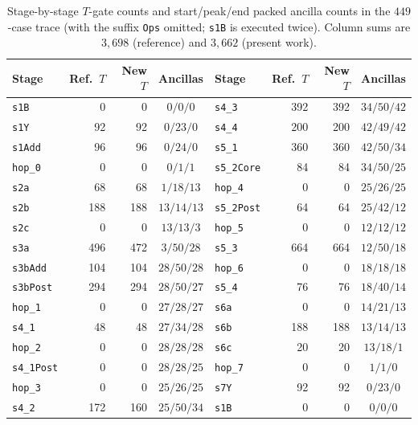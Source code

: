 \documentclass[11pt,a4paper]{article}
\theoremstyle{definition}
\theoremstyle{remark}
\begin{document}
\begin{table}[tbp]
\centering\small
\setlength{\tabcolsep}{3pt}
\begin{tabular}{@{}lrrc@{\qquad}lrrc@{}}
\toprule
Stage & Ref.\ \(T\) & New \(T\) & Ancillas &
Stage & Ref.\ \(T\) & New \(T\) & Ancillas \\
\midrule
\texttt{s1B} & 0 & 0 & \(0/0/0\) & \texttt{s4\_3} & 392 & 392 & \(34/50/42\) \\
\texttt{s1Y} & 92 & 92 & \(0/23/0\) & \texttt{s4\_4} & 200 & 200 & \(42/49/42\) \\
\texttt{s1Add} & 96 & 96 & \(0/24/0\) & \texttt{s5\_1} & 360 & 360 & \(42/50/34\) \\
\texttt{hop\_0} & 0 & 0 & \(0/1/1\) & \texttt{s5\_2Core} & 84 & 84 & \(34/50/25\) \\
\texttt{s2a} & 68 & 68 & \(1/18/13\) & \texttt{hop\_4} & 0 & 0 & \(25/26/25\) \\
\texttt{s2b} & 188 & 188 & \(13/14/13\) & \texttt{s5\_2Post} & 64 & 64 & \(25/42/12\) \\
\texttt{s2c} & 0 & 0 & \(13/13/3\) & \texttt{hop\_5} & 0 & 0 & \(12/12/12\) \\
\texttt{s3a} & 496 & 472 & \(3/50/28\) & \texttt{s5\_3} & 664 & 664 & \(12/50/18\) \\
\texttt{s3bAdd} & 104 & 104 & \(28/50/28\) & \texttt{hop\_6} & 0 & 0 & \(18/18/18\) \\
\texttt{s3bPost} & 294 & 294 & \(28/50/27\) & \texttt{s5\_4} & 76 & 76 & \(18/40/14\) \\
\texttt{hop\_1} & 0 & 0 & \(27/28/27\) & \texttt{s6a} & 0 & 0 & \(14/21/13\) \\
\texttt{s4\_1} & 48 & 48 & \(27/34/28\) & \texttt{s6b} & 188 & 188 & \(13/14/13\) \\
\texttt{hop\_2} & 0 & 0 & \(28/28/28\) & \texttt{s6c} & 20 & 20 & \(13/18/1\) \\
\texttt{s4\_1Post} & 0 & 0 & \(28/28/25\) & \texttt{hop\_7} & 0 & 0 & \(1/1/0\) \\
\texttt{hop\_3} & 0 & 0 & \(25/26/25\) & \texttt{s7Y} & 92 & 92 & \(0/23/0\) \\
\texttt{s4\_2} & 172 & 160 & \(25/50/34\) & \texttt{s1B} & 0 & 0 & \(0/0/0\) \\
\bottomrule
\end{tabular}
\caption{Stage-by-stage \(T\)-gate counts and start/peak/end packed ancilla counts in the \(449\)-case trace (with the suffix \texttt{Ops} omitted; \texttt{s1B} is executed twice). Column sums are \(3{,}698\) (reference) and \(3{,}662\) (present work).}
\label{tab:arcsin-stages}
\end{table}
\end{document}
